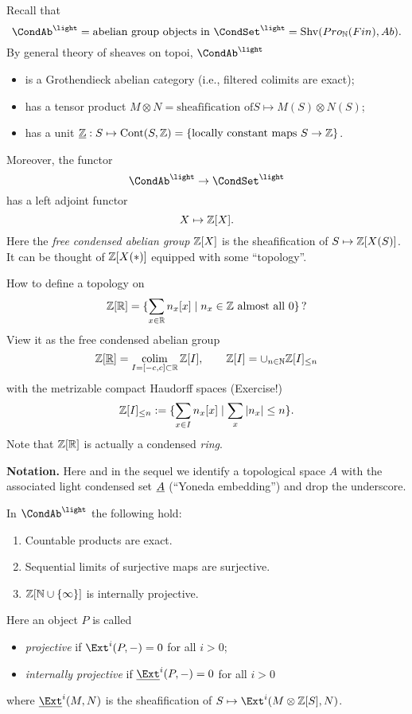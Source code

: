 \documentclass{notes}
\begin{document}
Recall that
$$
  \CondAb^\light = \text{abelian group objects in }\CondSet^\light =
         {\rm Shv}(Pro_\N(Fin),Ab).
$$
By general theory of sheaves on topoi, $\CondAb^\light$
\begin{itemize}
\item is a Grothendieck abelian category (i.e., filtered colimits are exact);
\item has a tensor product $M\otimes N=\text{sheafification of
}S\mapsto M(S)\otimes N(S)$;
\item has a unit $\underline{{\mathbb{Z}}}:S\mapsto {\rm Cont}(S,{\mathbb{Z}}) = \{\text{locally
  constant maps }S\to{\mathbb{Z}}\}$.
\end{itemize}
Moreover, the functor
$$
   \CondAb^\light \to \CondSet^\light
$$
has a left adjoint functor
$$
   X\mapsto {\mathbb{Z}}[X].
$$
Here the {\em free condensed abelian group} ${\mathbb{Z}}[X]$ is the
sheafification of $S\mapsto {\mathbb{Z}}[X(S)]$. It can be thought of ${\mathbb{Z}}[X(*)]$
equipped with some ``topology''. 

\begin{example}
How to define a topology on
$$
  {\mathbb{Z}}[{\mathbb{R}}] = \{\sum_{x\in{\mathbb{R}}}n_x[x]\mid n_x\in{\mathbb{Z}}\text{ almost all }0\}\,?
$$
View it as the free condensed abelian group
$$
  {\mathbb{Z}}[\underline{{\mathbb{R}}}] = \operatorname*{colim}_{I=[-c,c]\subset{\mathbb{R}}}{\mathbb{Z}}[I],\qquad
  {\mathbb{Z}}[I]=\cup_{n\in{\mathbb{N}}}{\mathbb{Z}}[I]_{\leq n} 
$$
with the metrizable compact Haudorff spaces (Exercise!)
$$
  {\mathbb{Z}}[I]_{\leq n} := \{\sum_{x\in I}n_x[x]\mid \sum_x|n_x|\leq n\}.
$$
Note that ${\mathbb{Z}}[{\mathbb{R}}]$ is actually a condensed {\em ring}. 
\end{example}

{\bf Notation. }
Here and in the sequel we identify a topological space $A$ with the
associated light condensed set $\underline{A}$ (``Yoneda embedding'') and drop
the underscore. 

\begin{thm}
In $\CondAb^\light$ the following hold:
\begin{enumerate}
\item Countable products are exact.
\item Sequential limits of surjective maps are surjective.
\item ${\mathbb{Z}}[{\mathbb{N}}\cup\{\infty\}]$ is internally projective.
\end{enumerate}
\end{thm}

Here an object $P$ is called
\begin{itemize}
\item {\em projective} if $\Ext^i(P,-)=0$ for all $i>0$;
\item {\em internally projective} if $\ul{\Ext}^i(P,-)=0$ for all $i>0$
\end{itemize}
where $\ul{\Ext}^i(M,N)$ is the sheafification of
$S\mapsto\Ext^i(M\otimes\Z[S],N)$. 
\end{document}
